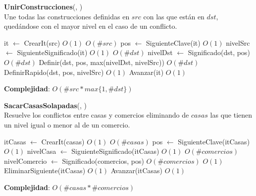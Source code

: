 \begin{Algoritmos}
\begin{algorithm}[H]{\textbf{UnirConstrucciones}(, )}
\\ {\small Une todas las construcciones definidas en $src$ con las que están en $dst$, quedándose con el mayor nivel en el caso de un conflicto.}
\begin{algorithmic}[1]
    \State it $\gets$ CrearIt(src) \Comment $O(1)$
     \Comment $O(\#src)$
        \State pos $\gets$ SiguienteClave(it) \Comment $O(1)$
        \State nivelSrc $\gets$ SiguienteSignificado(it) \Comment $O(1)$
         \Comment $O(\#dst)$
            \State nivelDst $\gets$ Significado(dst, pos) \Comment $O(\#dst)$
            \State Definir(dst, pos, max(nivelDst, nivelSrc)) \Comment $O(\#dst)$
        \Else
            \State DefinirRapido(dst, pos, nivelSrc) \Comment $O(1)$
        \EndIf
        \State Avanzar(it) \Comment $O(1)$
    \EndWhile
\end{algorithmic}
\textbf{Complejidad}: $O(\#src * max\{1, \#dst\})$
\end{algorithm}

\begin{algorithm}[H]{\textbf{SacarCasasSolapadas}(, )}
\\ {\small Resuelve los conflictos entre casas y comercios eliminando de $casas$ las que tienen un nivel igual o menor al de un comercio.}
\begin{algorithmic}[1]
    \State itCasas $\gets$ CrearIt(casas) \Comment $O(1)$
     \Comment $O(\#casas)$
        \State pos $\gets$ SiguienteClave(itCasas) \Comment $O(1)$
        \State nivelCasa $\gets$ SiguienteSignificado(itCasas) \Comment $O(1)$
         \Comment $O(\#comercios)$
            \State nivelComercio $\gets$ Significado(comercios, pos) \Comment $O(\#comercios)$
             \Comment $O(1)$
                \State EliminarSiguiente(itCasas) \Comment $O(1)$
            \EndIf
        \EndIf
        \State Avanzar(itCasas) \Comment $O(1)$
    \EndWhile
\end{algorithmic}
\textbf{Complejidad}: $O(\#casas * \#comercios)$
\end{algorithm}


\end{Algoritmos}
